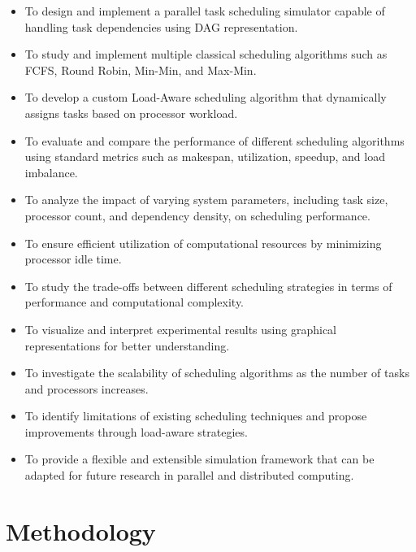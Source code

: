 \documentclass[12pt,a4paper]{article}
\begin{document}
\begin{itemize}

\item To design and implement a parallel task scheduling simulator capable of handling task dependencies using DAG representation.

\item To study and implement multiple classical scheduling algorithms such as FCFS, Round Robin, Min-Min, and Max-Min.

\item To develop a custom Load-Aware scheduling algorithm that dynamically assigns tasks based on processor workload.

\item To evaluate and compare the performance of different scheduling algorithms using standard metrics such as makespan, utilization, speedup, and load imbalance.

\item To analyze the impact of varying system parameters, including task size, processor count, and dependency density, on scheduling performance.

\item To ensure efficient utilization of computational resources by minimizing processor idle time.

\item To study the trade-offs between different scheduling strategies in terms of performance and computational complexity.

\item To visualize and interpret experimental results using graphical representations for better understanding.

\item To investigate the scalability of scheduling algorithms as the number of tasks and processors increases.

\item To identify limitations of existing scheduling techniques and propose improvements through load-aware strategies.

\item To provide a flexible and extensible simulation framework that can be adapted for future research in parallel and distributed computing.

\end{itemize}
	
	
	\section{Methodology}
\end{document}
